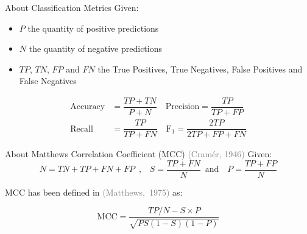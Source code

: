 \documentclass[11pt,aspectratio=169]{beamer}
\begin{document}
\begin{frame}{About Classification Metrics}
    Given:
    \begin{itemize}
        \item $P$ the quantity of positive predictions
        \item $N$ the quantity of negative predictions
        \item $\mathit{TP}$, $\mathit{TN}$, $\mathit{FP}$ and $\mathit{FN}$ the True Positives, True Negatives, False Positives and False Negatives
    \end{itemize}
        \begin{align}
        \text{Accuracy} & = \dfrac{\mathit{TP} + \mathit{TN}}{P+N} \quad
        \text{Precision} = \dfrac{\mathit{TP}}{\mathit{TP}+\mathit{FP}} \\[0.5ex]
        \text{Recall} & = \dfrac{\mathit{TP}}{\mathit{TP}+\mathit{FN}}\quad 
        \text{F}_1 = \dfrac{2\mathit{TP}}{2\mathit{TP}+\mathit{FP}+\mathit{FN}}
    \end{align}
    \end{frame}
    
    \begin{frame}{About Matthews Correlation Coefficient (MCC) \textcolor{gray}{\footnotesize (Cramér, 1946)}}
        Given:
        \begin{equation}
    N = \mathit{TN}+\mathit{TP}+\mathit{FN}+\mathit{FP} \enspace \text{,} \quad S = \frac{\mathit{TP}+\mathit{FN}}{N} \enspace \text{and} \quad P = \frac{\mathit{TP}+\mathit{FP}}{N}
    \end{equation}
    
    MCC has been defined in \textcolor{gray}{\footnotesize (Matthews,~1975)} as:
    
    \begin{equation}
        \text{MCC} = \frac{\mathit{TP}/ N-S \times P}{\sqrt{P S(1-S)(1-P)}}
    \end{equation}
    \end{frame}
        
\end{document}
